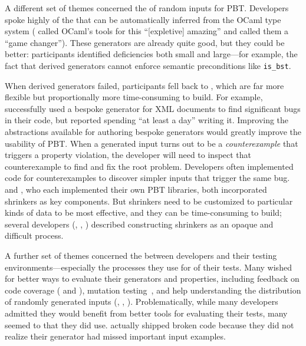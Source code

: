 A different set of themes concerned the  of
random inputs for PBT. Developers spoke
highly of the  that can be automatically
inferred from
the OCaml type system ( called OCaml's tools for this
``[expletive] amazing'' and  called them a ``game changer'').
These generators are already quite good, but they could be better: participants
identified deficiencies both small and large---for example, the fact
that derived generators
cannot enforce semantic preconditions like \lstinline{is_bst}.

When derived generators
failed, participants fell back to , which
are far more flexible but proportionally more time-consuming to
build. For example,  successfully used a bespoke
generator for XML documents to find significant bugs in their code,
but reported spending ``at least a day'' writing it.
Improving the abstractions available for authoring bespoke generators would
greatly improve the usability of PBT.
%
When a generated input turns out to be a {\em counterexample} that triggers
a property violation, the developer will need to inspect that
counterexample to find
and fix the root problem. Developers often implemented code for
 counterexamples to discover
simpler inputs that trigger the same bug.  
and , who each implemented their own PBT libraries, both
incorporated shrinkers as key components. But
shrinkers need to be customized to particular kinds of data to be most
effective, and they can be time-consuming to build; several
developers
(,  , )
described constructing shrinkers as an opaque and difficult process.

A further set of themes concerned the
 between developers and their
testing environments---especially the processes they use
for  of their tests. Many
wished for
better ways to evaluate their generators and properties, including
feedback on code coverage ( and ),
mutation
testing~\cite{papadakis_mutation_2018}, and help understanding the
distribution of randomly generated
inputs (, , ). Problematically,
while many developers admitted they would benefit from better tools for
evaluating their tests, many seemed to
 that they did use.  actually shipped broken code because
they did not realize their generator had missed important input
examples.
\iflater
{}
\fi


